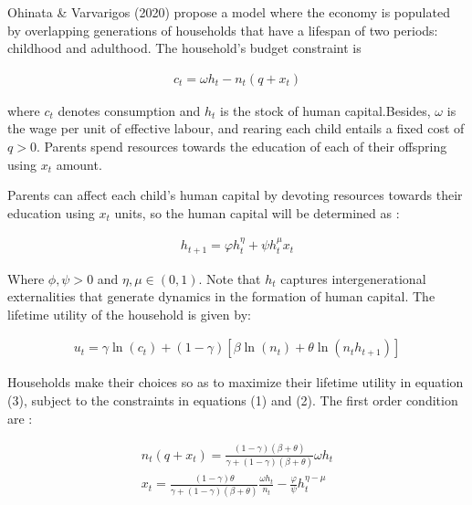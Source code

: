 
Ohinata \& Varvarigos (2020) propose a model where the economy is populated by overlapping generations of households that have
a lifespan of two periods: childhood and adulthood. The household’s budget constraint is

    \begin{equation}
    \begin{aligned}
    c_{t} = \omega h_{t} - n_{t}(q+x_{t})
    \end{aligned}
    \end{equation}

where $c_{t}$ denotes consumption and $h_{t}$ is the stock of human capital.Besides, $\omega$ is the wage per unit of effective labour, and  rearing each child entails a fixed cost of $q>0$. Parents spend resources towards the education of each of their offspring using $x_t$ amount.  

Parents can affect each child’s human capital by devoting resources towards their education using $x_t$ units, so the human capital will be determined as : 

    \begin{equation}
    \begin{aligned}
    h_{t+1} = \varphi h_{t}^{\eta} + \psi h_{t}^{\mu}x_t 
    \end{aligned}
    \end{equation}

Where $\phi , \psi > 0$ and $\eta , \mu  \in (0, 1)$. Note that $h_t$ captures intergenerational externalities that generate dynamics in the formation of human capital. The lifetime utility of the household is given by:

    \begin{equation}
    \begin{aligned}
    u_{t} = \gamma \ln(c_t) + (1-\gamma)[\beta \ln(n_t) + \theta \ln(n_t h_{t+1})]
    \end{aligned}
    \end{equation}
    
Households make their choices so as to maximize their lifetime utility in
equation (3), subject to the constraints in equations (1) and (2). The first order condition are :

    \begin{equation}
    \begin{aligned}
    n_t (q+x_t) = \frac{(1-\gamma)(\beta + \theta)}{\gamma + (1-\gamma)(\beta + \theta)} \omega h_t \\
    x_t = \frac{(1-\gamma)\theta}{\gamma + (1-\gamma)(\beta + \theta)}\frac{\omega h_t}{n_t} - \frac{\varphi}{\psi} h_t^{\eta - \mu}
    \end{aligned}
    \end{equation}

